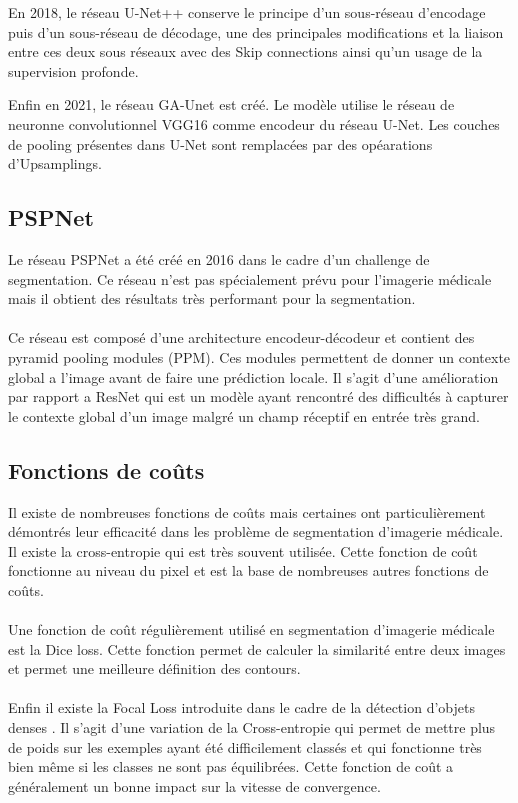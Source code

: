 \documentclass[french, english]{article}
\begin{document}
En 2018, le réseau U-Net++ \cite{U-Net++} conserve le principe d'un sous-réseau d'encodage puis d'un sous-réseau de décodage, une des principales modifications et la liaison entre ces deux sous réseaux avec des Skip connections ainsi qu'un usage de la supervision profonde.

Enfin en 2021, le réseau GA-Unet \cite{GA-UNet} est créé. Le modèle utilise le réseau de neuronne convolutionnel VGG16 comme encodeur du réseau U-Net. Les couches de pooling présentes dans U-Net sont remplacées par des opéarations d'Upsamplings. 

\subsection{PSPNet} Le réseau PSPNet a été créé en 2016 \cite{PSPNet} dans le cadre d'un challenge de segmentation. Ce réseau n'est pas spécialement prévu pour l'imagerie médicale mais il obtient des résultats très performant pour la segmentation. \paragraph{}Ce réseau est composé d'une architecture encodeur-décodeur et contient des pyramid pooling modules (PPM). Ces modules permettent de donner un contexte global a l'image avant de faire une prédiction locale. Il s'agit d'une amélioration par rapport a ResNet \cite{ResNet} qui est un modèle ayant rencontré des difficultés à capturer le contexte global d'un image malgré un champ réceptif en entrée très grand.


\subsection{Fonctions de coûts}
Il existe de nombreuses fonctions de coûts mais certaines ont particulièrement démontrés leur efficacité dans les problème de segmentation d'imagerie médicale. Il existe la cross-entropie qui est très souvent utilisée. Cette fonction de coût fonctionne au niveau du pixel et est la base de nombreuses autres fonctions de coûts.
\paragraph{}Une fonction de coût régulièrement utilisé en segmentation d'imagerie médicale est la Dice loss. Cette fonction permet de calculer la similarité entre deux images et permet une meilleure définition des contours. 
\paragraph{}Enfin il existe la Focal Loss introduite dans le cadre de la détection d'objets denses \cite{Focal-Loss}. Il s'agit d'une variation de la Cross-entropie qui permet de mettre plus de poids sur les exemples ayant été difficilement classés et qui fonctionne très bien même si les classes ne sont pas équilibrées. Cette fonction de coût a généralement un bonne impact sur la vitesse de convergence.
\end{document}

